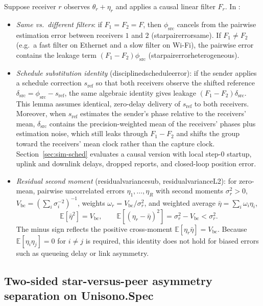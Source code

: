 \documentclass[11pt,a4paper]{article}
\DeclareRobustCommand{\lean}[1]{{\ttfamily\def\_{\textunderscore\allowbreak}#1}}
\newcommand{\E}{\mathbb{E}}
\theoremstyle{definition}
\begin{document}
Suppose receiver $r$ observes $\theta_r + \eta_r$ and applies a causal linear
filter $F_r$. In :
\begin{itemize}
\item \emph{Same vs.\ different filters}: if $F_1 = F_2 = F$, then
  $\phi_{\mathrm{src}}$ cancels from the pairwise estimation error between
  receivers $1$ and $2$ (\lean{star\_pair\_error\_same}). If $F_1 \ne F_2$
  (e.g.\ a fast filter on Ethernet and a slow filter on Wi-Fi), the pairwise
  error contains the leakage term $(F_1 - F_2)\phi_{\mathrm{src}}$
  (\lean{star\_pair\_error\_heterogeneous}).
\item \emph{Schedule substitution identity}
  (\lean{disciplined\_schedule\_error}): if the sender applies a schedule
  correction $s_{\mathrm{ref}}$ so that both receivers observe the shifted
  reference $\delta_{\mathrm{src}} = \phi_{\mathrm{src}} - s_{\mathrm{ref}}$,
  the same algebraic identity gives leakage $(F_1 - F_2)\delta_{\mathrm{src}}$.
  This lemma assumes identical, zero-delay delivery of $s_{\mathrm{ref}}$ to
  both receivers. Moreover, when $s_{\mathrm{ref}}$ estimates the sender's
  phase relative to the receivers' mean, $\delta_{\mathrm{src}}$ contains the
  precision-weighted mean of the receivers' phases plus estimation noise, which
  still leaks through $F_1 - F_2$ and shifts the group toward the receivers'
  mean clock rather than the capture clock. Section~\ref{sec:sim-sched}
  evaluates a causal version with local step-0 startup, uplink and downlink
  delays, dropped reports, and closed-loop position error.
\item \emph{Residual second moment} (\lean{residual\_variance\_sub},
  \lean{residual\_variance\_L2}): for zero-mean, pairwise uncorrelated errors
  $\eta_1, \dots, \eta_R$ with second moments $\sigma_r^2 > 0$,
  $V_{\mathrm{bc}} = (\sum_i \sigma_i^{-2})^{-1}$, weights
  $\omega_r = V_{\mathrm{bc}} / \sigma_r^2$, and weighted average
  $\bar\eta = \sum_i \omega_i \eta_i$,
  \[
    \E[\bar\eta^2] = V_{\mathrm{bc}},
    \qquad
    \E[(\eta_r - \bar\eta)^2] = \sigma_r^2 - V_{\mathrm{bc}} < \sigma_r^2 .
  \]
  The minus sign reflects the positive cross-moment
  $\E[\eta_r \bar\eta] = V_{\mathrm{bc}}$. Because $\E[\eta_i \eta_j] = 0$ for
  $i \ne j$ is required, this identity does not hold for biased errors such as
  queueing delay or link asymmetry.
\end{itemize}

\subsection{Two-sided star-versus-peer asymmetry separation on \lean{Unisono.Spec}}
\end{document}
